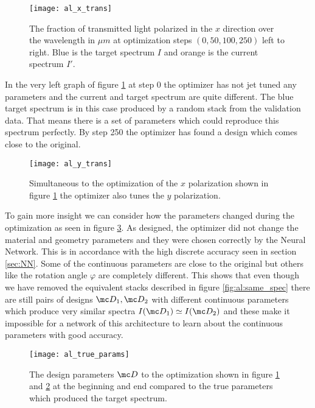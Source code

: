 \begin{figure}[H]
    \centering
    \texttt{[image: al\_x\_trans]}
    \caption{The fraction of transmitted light polarized in the $x$ direction over the wavelength in $\mu m$ at optimization steps 
    $(0, 50, 100, 250)$ left to right. Blue is the target spectrum $I$ and orange is the current spectrum $I'$. }
    \label{fig:al:x_trans}
\end{figure}

In the very left graph of figure \ref{fig:al:x_trans} at step 0 the 
optimizer has not jet tuned any parameters and the current and target spectrum are quite different. The blue target spectrum is in this case produced by a random stack from the validation data. That means there is a set of parameters which could reproduce this spectrum perfectly. By step 250 the optimizer has found a design which comes close to the original.

\begin{figure}[H]
    \centering
    \texttt{[image: al\_y\_trans]}
    \caption{Simultaneous to the optimization of the $x$ polarization shown in figure \ref{fig:al:x_trans} the optimizer also tunes the $y$ polarization.}
    \label{fig:al:y_trans}
\end{figure}

To gain more insight we can consider how the parameters changed during the optimization as seen in figure \ref{fig:al:true_params}. As designed, the optimizer did not change the material and geometry parameters and they were chosen correctly by the Neural Network. This is in accordance with the high discrete accuracy seen in section \ref{sec:NN}. Some of the continuous parameters are close to the original but others like the rotation angle $\varphi$ are completely different. This shows that even though we have removed the equivalent stacks described in figure \ref{fig:al:same_spec} there are still pairs of designs $\mc D_1, \mc D_2$ with different continuous parameters which produce very similar spectra $I \qty(\mc D_1) \simeq I \qty(\mc D_2)$ and these make it impossible for a network of this architecture to learn about the continuous parameters with good accuracy.

\begin{figure}[H]
    \centering
    \texttt{[image: al\_true\_params]}
    \caption{The design parameters $\mc D$ to the optimization shown in figure \ref{fig:al:x_trans} and \ref{fig:al:y_trans} at the beginning and end compared to the true parameters which produced the target spectrum.}
    \label{fig:al:true_params}
\end{figure} 